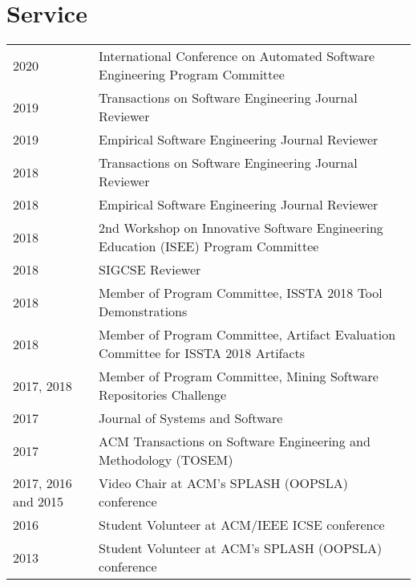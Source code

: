 \documentclass[10pt]{article}
\begin{document}
%
\vspace{15pt}
\section{Service}

\noindent\begin{tabular}{p{2.5cm}p{10.5cm}}
2020 & International Conference on Automated Software Engineering Program Committee\\
2019 & Transactions on Software Engineering Journal Reviewer\\
2019 & Empirical Software Engineering Journal Reviewer\\
2018 & Transactions on Software Engineering Journal Reviewer\\
2018 & Empirical Software Engineering Journal Reviewer\\
2018 & 2nd Workshop on Innovative Software Engineering Education (ISEE) Program Committee \\
2018 & SIGCSE Reviewer \\
2018 & Member of Program Committee, ISSTA 2018 Tool Demonstrations \\
2018 & Member of Program Committee, Artifact Evaluation Committee for ISSTA 2018 Artifacts \\
2017, 2018 & Member of Program Committee, Mining Software Repositories Challenge \\
2017 & Journal of Systems and Software \\
2017 & ACM Transactions on Software Engineering and Methodology (TOSEM) \\

2017, 2016 and 2015 &Video Chair at ACM's SPLASH (OOPSLA) conference\\
2016 &Student Volunteer at ACM/IEEE ICSE conference\\
2013 &Student Volunteer at ACM's SPLASH (OOPSLA) conference\\
\end{tabular}\\

\vspace{10pt}
%
%
%
\end{document}
